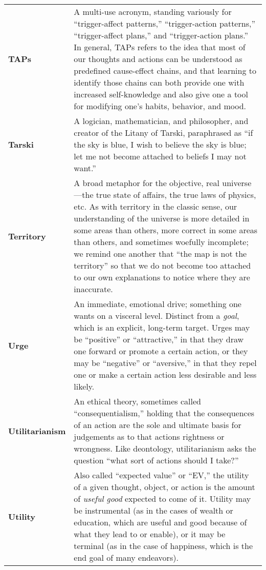 \begin{longtable} { p{} p{} }
\textbf{TAPs} & A multi-use acronym, standing variously for ``trigger-affect patterns,'' ``trigger-action patterns,'' ``trigger-affect plans,'' and ``trigger-action plans.''  In general, TAPs refers to the idea that most of our thoughts and actions can be understood as predefined cause-effect chains, and that learning to identify those chains can both provide one with increased self-knowledge and also give one a tool for modifying one's habits, behavior, and mood.\\

\textbf{Tarski} & A logician, mathematician, and philosopher, and creator of the Litany of Tarski, paraphrased as ``if the sky is blue, I wish to believe the sky is blue; let me not become attached to beliefs I may not want.''\\

\textbf{Territory} & A broad metaphor for the objective, real universe---the true state of affairs, the true laws of physics, etc.  As with territory in the classic sense, our understanding of the universe is more detailed in some areas than others, more correct in some areas than others, and sometimes woefully incomplete; we remind one another that ``the map is not the territory'' so that we do not become too attached to our own explanations to notice where they are inaccurate.\\

\textbf{Urge} & An immediate, emotional drive; something one wants on a visceral level.  Distinct from a \emph{goal}, which is an explicit, long-term target.  Urges may be ``positive'' or ``attractive,'' in that they draw one forward or promote a certain action, or they may be ``negative'' or ``aversive,'' in that they repel one or make a certain action less desirable and less likely.\\

\textbf{Utilitarianism} & An ethical theory, sometimes called ``consequentialism,'' holding that the consequences of an action are the sole and ultimate basis for judgements as to that actions rightness or wrongness.  Like deontology, utilitarianism asks the question ``what sort of actions should I take?''\\

\textbf{Utility} & Also called ``expected value'' or ``EV,'' the utility of a given thought, object, or action is the amount of \emph{useful good} expected to come of it.  Utility may be instrumental (as in the cases of wealth or education, which are useful and good because of what they lead to or enable), or it may be terminal (as in the case of happiness, which is the end goal of many endeavors).\\


\end{longtable}
